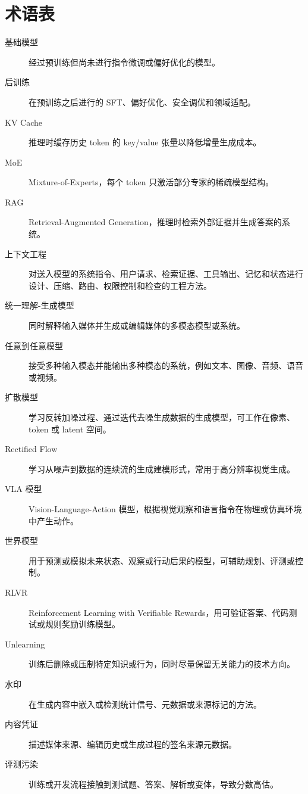 \documentclass[UTF8,zihao=-4,openany]{ctexbook}
\newcommand{\rag}{RAG}
\begin{document}
\section{术语表}
\begin{description}
\item[基础模型] 经过预训练但尚未进行指令微调或偏好优化的模型。
\item[后训练] 在预训练之后进行的 SFT、偏好优化、安全调优和领域适配。
\item[KV Cache] 推理时缓存历史 token 的 key/value 张量以降低增量生成成本。
\item[MoE] Mixture-of-Experts，每个 token 只激活部分专家的稀疏模型结构。
\item[\rag] Retrieval-Augmented Generation，推理时检索外部证据并生成答案的系统。
\item[上下文工程] 对送入模型的系统指令、用户请求、检索证据、工具输出、记忆和状态进行设计、压缩、路由、权限控制和检查的工程方法。
\item[统一理解-生成模型] 同时解释输入媒体并生成或编辑媒体的多模态模型或系统。
\item[任意到任意模型] 接受多种输入模态并能输出多种模态的系统，例如文本、图像、音频、语音或视频。
\item[扩散模型] 学习反转加噪过程、通过迭代去噪生成数据的生成模型，可工作在像素、token 或 latent 空间。
\item[Rectified Flow] 学习从噪声到数据的连续流的生成建模形式，常用于高分辨率视觉生成。
\item[VLA 模型] Vision-Language-Action 模型，根据视觉观察和语言指令在物理或仿真环境中产生动作。
\item[世界模型] 用于预测或模拟未来状态、观察或行动后果的模型，可辅助规划、评测或控制。
\item[RLVR] Reinforcement Learning with Verifiable Rewards，用可验证答案、代码测试或规则奖励训练模型。
\item[Unlearning] 训练后删除或压制特定知识或行为，同时尽量保留无关能力的技术方向。
\item[水印] 在生成内容中嵌入或检测统计信号、元数据或来源标记的方法。
\item[内容凭证] 描述媒体来源、编辑历史或生成过程的签名来源元数据。
\item[评测污染] 训练或开发流程接触到测试题、答案、解析或变体，导致分数高估。
\end{description}

\backmatter
{}
{}


\end{document}

